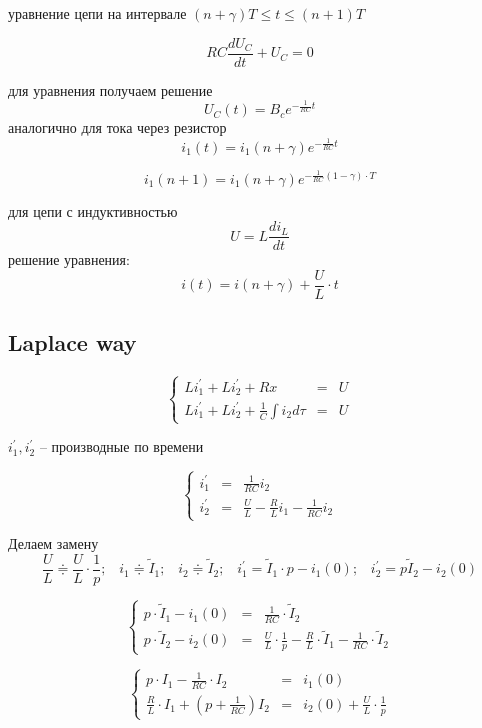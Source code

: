 \documentclass[a4paper,12pt]{article}
\begin{document}
уравнение цепи на интервале $(n+\gamma)T \le t \le (n+1)T$

$$
RC \frac{d U_C}{dt} + U_C = 0
$$


 для уравнения получаем решение
$$
U_C(t) = B_c e^{-\frac{1}{RC}t}
$$
аналогично для тока через резистор
$$
i_1(t) = i_1(n+\gamma) e^{-\frac{1}{RC}t}
$$

$$
i_1(n+1) = i_1(n+\gamma) e^{-\frac{1}{RC}(1-\gamma)\cdot T}
$$

для цепи с индуктивностью 
$$
U = L\frac{d i_L}{dt} 
$$
решение уравнения:
$$
i(t) = i(n+\gamma) + \frac{U}{L}\cdot t
$$


\subsection{Laplace way}

$$
\left\{
\begin{array}{lcl}
	Li_1^\prime + L i_2^\prime + Rx &=& U\\[1.5mm]
	Li_1^\prime + L i_2^\prime + \frac{1}{C}\int i_2 d\tau &=& U
\end{array}
\right.
$$

$i_1^\prime, i_2^\prime $ -- производные по времени

$$
\left\{
\begin{array}{lcl}
	i_1^\prime &=& \frac{1}{RC} i_2\\[1.5mm]
	i_2^\prime &=& \frac{U}{L} - \frac{R}{L} i_1 - \frac{1}{RC} i_2
\end{array}
\right.
$$

Делаем замену
$$
\frac{U}{L} \doteqdot \frac{U}{L} \cdot \frac{1}{p};\; \; \; i_1 \doteqdot \tilde{I}_1 ;\; \; \; i_2 \doteqdot \tilde{I}_2; \; \; \;
i_1^\prime = \tilde{I}_1\cdot p - i_1(0); \; \; \;  i_2^\prime = p \tilde{I}_2 - i_2(0)
$$

$$
\left\{
	\begin{array}{lcl}
		p\cdot \tilde{I}_1 - i_1(0) &=& \frac{1}{RC} \cdot \tilde{I}_2\\[1.5mm]
		p\cdot \tilde{I}_2 - i_2(0) &=& \frac{U}{L}\cdot \frac{1}{p} - \frac{R}{L}\cdot \tilde{I}_1 -  \frac{1}{RC} \cdot \tilde{I}_2
	\end{array}
\right.
$$

$$
\left\{
\begin{array}{lcl}
	p\cdot I_1 - \frac{1}{RC}\cdot I_2& =& i_1(0)\\[1.5mm]
	\frac{R}{L}\cdot I_1 + \left( p + \frac{1}{RC}\right) I_2 &=& i_2(0) + \frac{U}{L}\cdot \frac{1}{p}
\end{array}
\right.
$$
\end{document}
